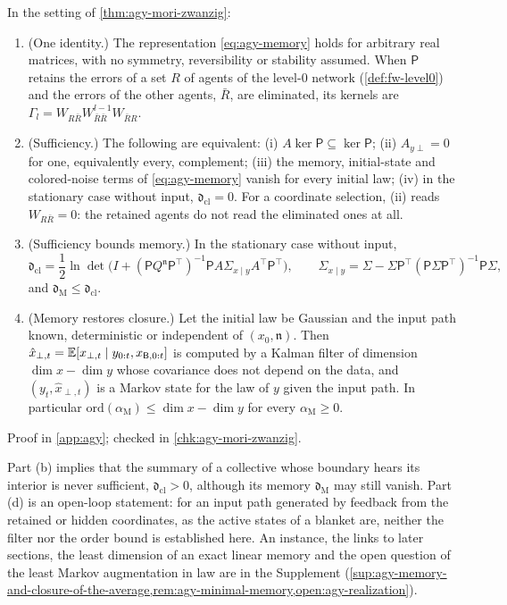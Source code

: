 \begin{theorem}\label{thm:agy-closure-identity}
In the setting of \cref{thm:agy-mori-zwanzig}:
\begin{enumerate}
\item[(a)] (One identity.) The representation \eqref{eq:agy-memory} holds for arbitrary real matrices, with no symmetry, reversibility or stability assumed. When $\mathsf P$ retains the errors of a set $R$ of agents of the level-0 network (\cref{def:fw-level0}) and the errors of the other agents, $\bar R$, are eliminated, its kernels are $\Gamma_l=W_{R\bar R}W_{\bar R\bar R}^{l-1}W_{\bar RR}$.
\item[(b)] (Sufficiency.) The following are equivalent: (i) $A\ker\mathsf P\subseteq\ker\mathsf P$; (ii) $A_{y\perp}=0$ for one, equivalently every, complement; (iii) the memory, initial-state and colored-noise terms of \eqref{eq:agy-memory} vanish for every initial law; (iv) in the stationary case without input, $\mathfrak d_{\mathrm{cl}}=0$. For a coordinate selection, (ii) reads $W_{R\bar R}=0$: the retained agents do not read the eliminated ones at all.
\item[(c)] (Sufficiency bounds memory.) In the stationary case without input,
\begin{equation}\label{eq:agy-closure-defect}
\mathfrak d_{\mathrm{cl}}=\frac12\ln\det\bigl(I+(\mathsf PQ^{\mathfrak n}\mathsf P^\top)^{-1}\mathsf PA\Sigma_{x\mid y}A^\top\mathsf P^\top\bigr),\qquad\Sigma_{x\mid y}=\Sigma-\Sigma\mathsf P^\top(\mathsf P\Sigma\mathsf P^\top)^{-1}\mathsf P\Sigma,
\end{equation}
and $\mathfrak d_{\mathrm M}\le\mathfrak d_{\mathrm{cl}}$.
\item[(d)] (Memory restores closure.) Let the initial law be Gaussian and the input path known, deterministic or independent of $(x_0,\mathfrak n)$. Then $\hat x_{\perp,t}=\mathbb{E}[x_{\perp,t}\mid y_{0:t},x_{\mathsf{B},0:t}]$ is computed by a Kalman filter of dimension $\dim x-\dim y$ whose covariance does not depend on the data, and $(y_t,\hat x_{\perp,t})$ is a Markov state for the law of $y$ given the input path. In particular $\mathrm{ord}(\alpha_{\mathrm M})\le\dim x-\dim y$ for every $\alpha_{\mathrm M}\ge0$.
\end{enumerate}
Proof in \cref{app:agy}; checked in \cref{chk:agy-mori-zwanzig}.
\end{theorem}

Part (b) implies that the summary of a collective whose boundary hears its interior is never sufficient, $\mathfrak d_{\mathrm{cl}}>0$, although its memory $\mathfrak d_{\mathrm M}$ may still vanish. Part (d) is an open-loop statement: for an input path generated by feedback from the retained or hidden coordinates, as the active states of a blanket are, neither the filter nor the order bound is established here. An instance, the links to later sections, the least dimension of an exact linear memory and the open question of the least Markov augmentation in law are in the Supplement (\cref{sup:agy-memory-and-closure-of-the-average,rem:agy-minimal-memory,open:agy-realization}).

